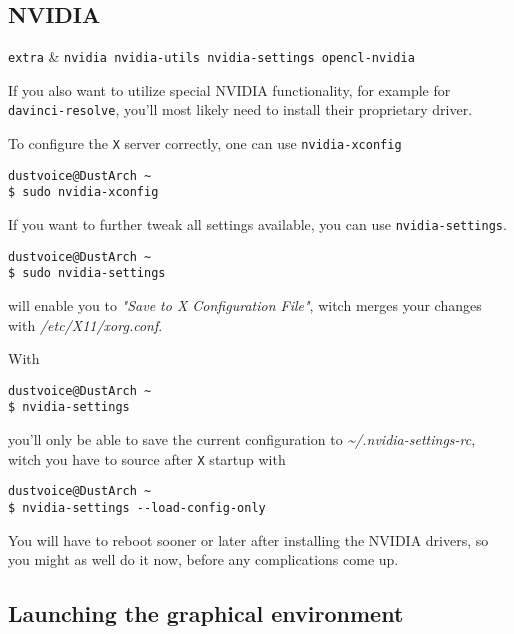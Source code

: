 \documentclass[10pt]{dustdoc}
\begin{document}
\subsection{NVIDIA}
\label{sec:nvidia}

\begin{packagetable}
    \texttt{extra} & \texttt{nvidia nvidia-utils nvidia-settings opencl-nvidia} \\
\end{packagetable}

If you also want to utilize special NVIDIA functionality, for example for \texttt{davinci-resolve}, you’ll most likely need to install their proprietary driver.

To configure the \texttt{X} server correctly, one can use \texttt{nvidia-xconfig}

\begin{verbatim}
dustvoice@DustArch ~
$ sudo nvidia-xconfig
\end{verbatim}

If you want to further tweak all settings available, you can use \texttt{nvidia-settings}.

\begin{verbatim}
dustvoice@DustArch ~
$ sudo nvidia-settings
\end{verbatim}

\noindent
will enable you to \emph{"Save to X Configuration File"}, witch merges your changes with \textit{/etc/X11/xorg.conf}.

With

\begin{verbatim}
dustvoice@DustArch ~
$ nvidia-settings
\end{verbatim}

\noindent
you’ll only be able to save the current configuration to \textit{\~{}/.nvidia-settings-rc}, witch you have to source after \texttt{X} startup with

\begin{verbatim}
dustvoice@DustArch ~
$ nvidia-settings --load-config-only
\end{verbatim}

\begin{NOTE}
    You will have to reboot sooner or later after installing the NVIDIA drivers, so you might as well do it now, before any complications come up.
\end{NOTE}

\subsection{Launching the graphical environment}
\label{sec:launching-the-graphical-environment}
\end{document}
